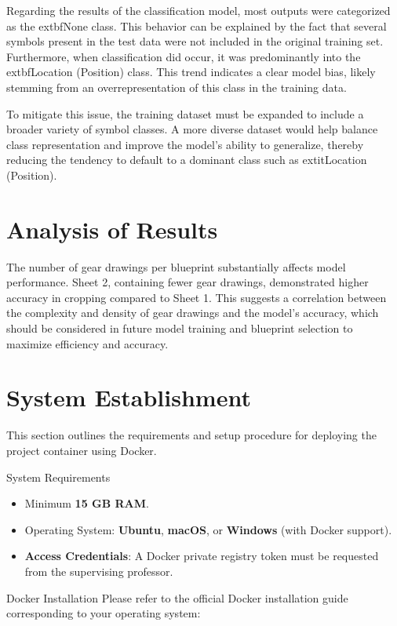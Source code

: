 \documentclass[11pt,a4paper]{article}
\begin{document}
Regarding the results of the classification model, most outputs were categorized as the 	extbf{None} class. This behavior can be explained by the fact that several symbols present in the test data were not included in the original training set. Furthermore, when classification did occur, it was predominantly into the 	extbf{Location (Position)} class. This trend indicates a clear model bias, likely stemming from an overrepresentation of this class in the training data.

To mitigate this issue, the training dataset must be expanded to include a broader variety of symbol classes. A more diverse dataset would help balance class representation and improve the model’s ability to generalize, thereby reducing the tendency to default to a dominant class such as 	extit{Location (Position)}.

\section*{Analysis of Results}

The number of gear drawings per blueprint substantially affects model performance. Sheet 2, containing fewer gear drawings, demonstrated higher accuracy in cropping compared to Sheet 1. This suggests a correlation between the complexity and density of gear drawings and the model’s accuracy, which should be considered in future model training and blueprint selection to maximize efficiency and accuracy.


\section{System Establishment}

This section outlines the requirements and setup procedure for deploying the project container using Docker.

{System Requirements}
\begin{itemize}
    \item Minimum \textbf{15 GB RAM}.
    \item Operating System: \textbf{Ubuntu}, \textbf{macOS}, or \textbf{Windows} (with Docker support).
    \item \textbf{Access Credentials}: A Docker private registry token must be requested from the supervising professor.
\end{itemize}

{Docker Installation}
Please refer to the official Docker installation guide corresponding to your operating system:
\end{document}
